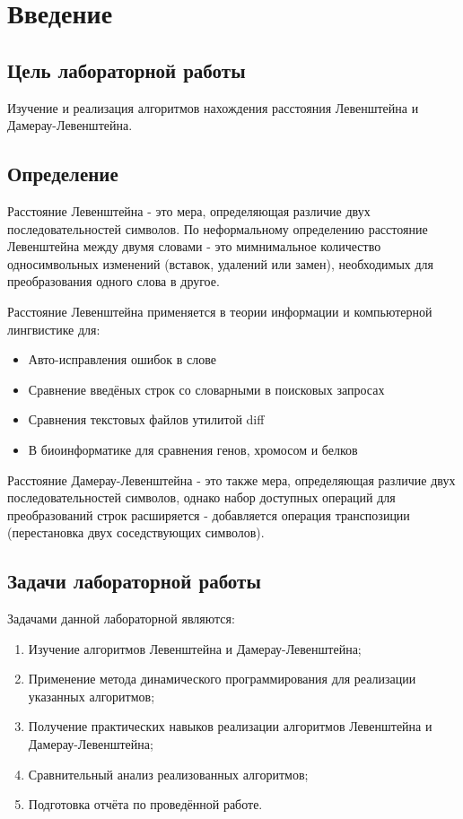 \documentclass[12pt]{report}
\begin{document}
\tableofcontents

\newpage
\chapter*{Введение}
\section*{Цель лабораторной работы}
Изучение и реализация алгоритмов нахождения расстояния Левенштейна и Дамерау-Левенштейна.
\section*{Определение}
Расстояние Левенштейна - это мера, определяющая различие двух последовательностей символов. По неформальному определению расстояние Левенштейна между двумя словами - это мимнимальное количество односимвольных изменений (вставок, удалений или замен), необходимых для преобразования одного слова в другое.

Расстояние Левенштейна применяется в теории информации и компьютерной лингвистике для:

\begin{itemize}
	\item Авто-исправления ошибок в слове
	\item Сравнение введёных строк со словарными в поисковых запросах
	\item Сравнения текстовых файлов утилитой diff
	\item В биоинформатике для сравнения генов, хромосом и белков
\end{itemize}

Расстояние Дамерау-Левенштейна - это также мера, определяющая различие двух последовательностей символов, однако набор доступных операций для преобразований строк расширяется - добавляется операция транспозиции (перестановка двух соседствующих символов).

\section*{Задачи лабораторной работы}
Задачами данной лабораторной являются:
\begin{enumerate}
  	\item Изучение алгоритмов Левенштейна и Дамерау-Левенштейна;
	\item Применение метода динамического программирования для реализации указанных алгоритмов; 
	\item Получение практических навыков реализации алгоритмов Левенштейна и Дамерау-Левенштейна; 
	\item Сравнительный анализ реализованных алгоритмов; 
	\item Подготовка отчёта по проведённой работе. 
\end{enumerate}
\end{document}
